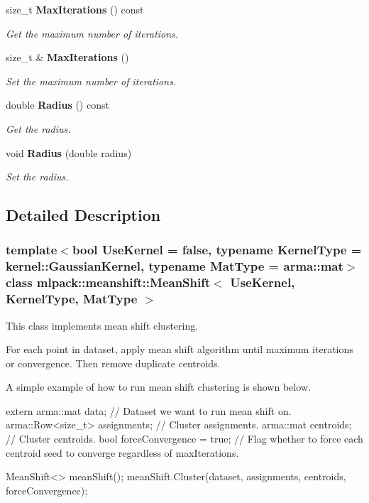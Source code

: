 \begin{DoxyCompactItemize}
size\+\_\+t \textbf{ Max\+Iterations} () const
\begin{DoxyCompactList}\small\item\em Get the maximum number of iterations. \end{DoxyCompactList}\item 
size\+\_\+t \& \textbf{ Max\+Iterations} ()
\begin{DoxyCompactList}\small\item\em Set the maximum number of iterations. \end{DoxyCompactList}\item 
double \textbf{ Radius} () const
\begin{DoxyCompactList}\small\item\em Get the radius. \end{DoxyCompactList}\item 
void \textbf{ Radius} (double radius)
\begin{DoxyCompactList}\small\item\em Set the radius. \end{DoxyCompactList}\end{DoxyCompactItemize}


\subsection{Detailed Description}
\subsubsection*{template$<$bool Use\+Kernel = false, typename Kernel\+Type = kernel\+::\+Gaussian\+Kernel, typename Mat\+Type = arma\+::mat$>$\newline
class mlpack\+::meanshift\+::\+Mean\+Shift$<$ Use\+Kernel, Kernel\+Type, Mat\+Type $>$}

This class implements mean shift clustering. 

For each point in dataset, apply mean shift algorithm until maximum iterations or convergence. Then remove duplicate centroids.

A simple example of how to run mean shift clustering is shown below.


\begin{DoxyCode}
\textcolor{keyword}{extern} arma::mat data; \textcolor{comment}{// Dataset we want to run mean shift on.}
arma::Row<size\_t> assignments; \textcolor{comment}{// Cluster assignments.}
arma::mat centroids; \textcolor{comment}{// Cluster centroids.}
\textcolor{keywordtype}{bool} forceConvergence = \textcolor{keyword}{true}; \textcolor{comment}{// Flag whether to force each centroid seed}
to converge regardless of maxIterations.

MeanShift<> meanShift();
meanShift.Cluster(dataset, assignments, centroids, forceConvergence);
\end{DoxyCode}



